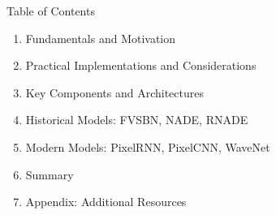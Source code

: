 \begin{frame}[allowframebreaks]{Table of Contents}
\begin{enumerate}
    \item Fundamentals and Motivation
    \item Practical Implementations and Considerations
    \item Key Components and Architectures
    \item Historical Models: FVSBN, NADE, RNADE
    \item Modern Models: PixelRNN, PixelCNN, WaveNet
    \item Summary
    \item Appendix: Additional Resources
\end{enumerate}
\end{frame}